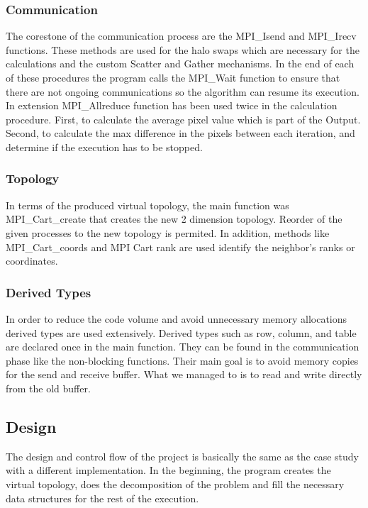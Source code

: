 \documentclass[12pt,a4paper]{article}
\begin{document}
        \subsubsection{Communication}
            The corestone of the communication process are the MPI\_Isend and MPI\_Irecv functions. These methods are used for the halo swaps which are necessary for the calculations and the custom Scatter and Gather mechanisms. In the end of each of these procedures the program calls the MPI\_Wait function to ensure that there are not ongoing communications so the algorithm can resume its execution. In extension MPI\_Allreduce function has been used twice in the calculation procedure. First, to calculate the average pixel value which is part of the Output. Second, to calculate the max difference in the pixels between each iteration, and determine if the execution has to be stopped.

        \subsubsection{Topology}
            In terms of the produced virtual topology, the main function was MPI\_Cart\_create that creates the new 2 dimension topology. Reorder of the given processes to the new topology is permited. In addition, methods like MPI\_Cart\_coords and MPI Cart rank are used identify the neighbor's ranks or coordinates.

        \subsubsection{Derived Types}
            In order to reduce the code volume and avoid unnecessary memory allocations derived types are used extensively. Derived types such as row, column, and table are declared once in the main function. They can be found in the communication phase like the non-blocking functions. Their main goal is to avoid memory copies for the send and receive buffer. What we managed to is to read and write directly from the old buffer.

    \subsection{Design}
        The design and control flow of the project is basically the same as the case study with a different implementation. In the beginning, the program creates the virtual topology, does the decomposition of the problem and fill the necessary data structures for the rest of the execution. 
\end{document}
